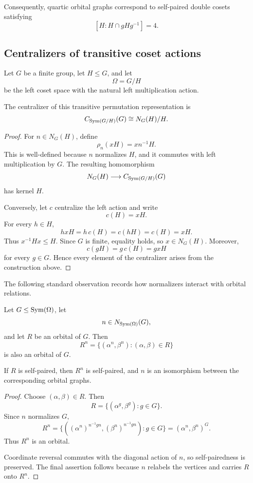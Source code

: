 Consequently, quartic orbital graphs correspond to self-paired double
cosets satisfying
\[
[H:H\cap gHg^{-1}]=4.
\]

\subsection{Centralizers of transitive coset actions}

Let \(G\) be a finite group, let \(H\leq G\), and let
\[
\Omega=G/H
\]
be the left coset space with the natural left multiplication action.

\begin{lemma}
\label{lem:coset-centralizer}
The centralizer of this transitive permutation representation is
\[
C_{\operatorname{Sym}(G/H)}(G)
\cong
N_G(H)/H.
\]
\end{lemma}

\begin{proof}
For \(n\in N_G(H)\), define
\[
\rho_n(xH)
=
xn^{-1}H.
\]
This is well-defined because \(n\) normalizes \(H\), and it commutes with
left multiplication by \(G\). The resulting homomorphism
\[
N_G(H)\longrightarrow C_{\operatorname{Sym}(G/H)}(G)
\]
has kernel \(H\).

Conversely, let \(c\) centralize the left action and write
\[
c(H)=xH.
\]
For every \(h\in H\),
\[
hxH
=
h\,c(H)
=
c(hH)
=
c(H)
=
xH.
\]
Thus \(x^{-1}Hx\leq H\). Since \(G\) is finite, equality holds, so
\(x\in N_G(H)\). Moreover,
\[
c(gH)
=
g\,c(H)
=
gxH
\]
for every \(g\in G\). Hence every element of the centralizer arises from
the construction above.
\end{proof}

The following standard observation records how normalizers interact with
orbital relations.

\begin{lemma}
\label{lem:normalizer-permutes-orbitals}
Let \(G\leq\operatorname{Sym}(\Omega)\), let
\[
n\in N_{\operatorname{Sym}(\Omega)}(G),
\]
and let \(R\) be an orbital of \(G\). Then
\[
R^n
=
\{
(\alpha^n,\beta^n):
(\alpha,\beta)\in R
\}
\]
is also an orbital of \(G\).

If \(R\) is self-paired, then \(R^n\) is self-paired, and \(n\) is an
isomorphism between the corresponding orbital graphs.
\end{lemma}

\begin{proof}
Choose \((\alpha,\beta)\in R\). Then
\[
R
=
\{
(\alpha^g,\beta^g):
g\in G
\}.
\]
Since \(n\) normalizes \(G\),
\[
R^n
=
\{
((\alpha^n)^{n^{-1}gn},
(\beta^n)^{n^{-1}gn}):
g\in G
\}
=
(\alpha^n,\beta^n)^G.
\]
Thus \(R^n\) is an orbital.

Coordinate reversal commutes with the diagonal action of \(n\), so
self-pairedness is preserved. The final assertion follows because \(n\)
relabels the vertices and carries \(R\) onto \(R^n\).
\end{proof}


